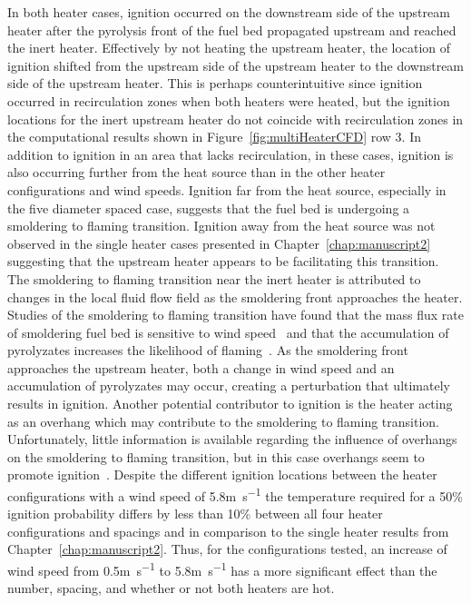     In both heater cases, ignition occurred on the downstream side of the upstream heater after the pyrolysis front of the fuel bed propagated upstream and reached the inert heater. Effectively by not heating the upstream heater, the location of ignition shifted from the upstream side of the upstream heater to the downstream side of the upstream heater. This is perhaps counterintuitive since ignition occurred in recirculation zones when both heaters were heated, but the ignition locations for the inert upstream heater do not coincide with recirculation zones in the computational results shown in Figure~\ref{fig:multiHeaterCFD} row 3. In addition to ignition in an area that lacks recirculation, in these cases, ignition is also occurring further from the heat source than in the other heater configurations and wind speeds. Ignition far from the heat source, especially in the five diameter spaced case, suggests that the fuel bed is undergoing a smoldering to flaming transition. Ignition away from the heat source was not observed in the single heater cases presented in Chapter~\ref{chap:manuscript2} suggesting that the upstream heater appears to be facilitating this transition. The smoldering to flaming transition near the inert heater is attributed to changes in the local fluid flow field as the smoldering front approaches the heater. Studies of the smoldering to flaming transition have found that the mass flux rate of smoldering fuel bed is sensitive to wind speed~\cite{Ohlemiller1990} and that the accumulation of pyrolyzates increases the likelihood of flaming~\cite{Stoliarov2018AnAssemblies}. As the smoldering front approaches the upstream heater, both a change in wind speed and an accumulation of pyrolyzates may occur, creating a perturbation that ultimately results in ignition. Another potential contributor to ignition is the heater acting as an overhang which may contribute to the smoldering to flaming transition. Unfortunately, little information is available regarding the influence of overhangs on the smoldering to flaming transition, but in this case overhangs seem to promote ignition~\cite{Santoso2019}. Despite the different ignition locations between the heater configurations with a wind speed of 5.8\si{\meter\per\second} the temperature required for a 50\% ignition probability differs by less than 10\% between all four heater configurations and spacings and in comparison to the single heater results from Chapter~\ref{chap:manuscript2}. Thus, for the configurations tested, an increase of wind speed from 0.5\si{\meter\per\second} to 5.8\si{\meter\per\second} has a more significant effect than the number, spacing, and whether or not both heaters are hot.
    
